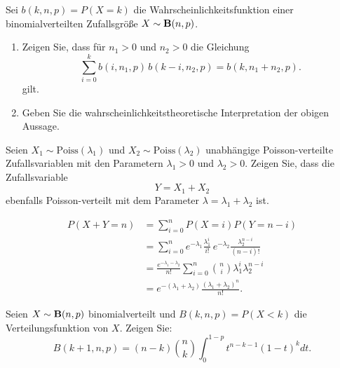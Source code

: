 \solution


Sei $b(k, n, p)=P(X=k)$ die Wahrscheinlichkeitsfunktion einer binomialverteilten
Zufallsgröße $X\sim\mathbf B(n,p)$.
\begin{enumerate}
    \item Zeigen Sie, dass für $n_1>0$ und $n_2>0$ die Gleichung
        \begin{equation*}
            \sum_{i=0}^{k} b(i, n_1, p)\, b( k-i, n_2, p) = b( k, n_1+n_2, p ).
        \end{equation*}
        gilt. 

    \item Geben Sie die wahrscheinlichkeitstheoretische Interpretation der
        obigen Aussage.
\end{enumerate}


 Seien $X_1\sim
\text{Poiss}(\lambda_1)$ und $X_2\sim \text{Poiss}(\lambda_2)$ unabhängige
Poisson-verteilte Zufallsvariablen mit den Parametern $\lambda_1>0$ und
$\lambda_2>0$. Zeigen Sie, dass die Zufallsvariable
\begin{equation*}
    Y = X_1 + X_2
\end{equation*}
ebenfalls Poisson-verteilt mit dem Parameter $\lambda=\lambda_1 + \lambda_2$ ist. 

\solution 
\begin{align*}
    P\left( X+Y=n \right) &= \sum_{i=0}^{n} P(X=i) P(Y=n-i) \\
    &= \sum_{i=0}^{n} e^{-\lambda_1} \frac{\lambda_{1}^{i}}{i!}\, e^{-\lambda_2} \frac{ \lambda_2^{n-i}}{(n-i)!} \\
    &= \frac{e^{-\lambda_1 -\lambda_2}}{n!} \sum_{i=0}^{n} \binom{n}{i} \lambda_1^{i} \lambda_2^{n-i} \\
    &= e^{- (\lambda_1 + \lambda_2)} \frac{ (\lambda_1 + \lambda_2)^{n}}{n!}.
\end{align*}


 Seien $X\sim\mathbf B(n,p)$ binomialverteilt
und $B(k, n, p) = P( X <k)$ die Verteilungsfunktion von $X$. Zeigen Sie:
\begin{equation*}
    B(k+1, n, p) = (n-k) \binom{n}{k} \int_{0}^{1-p} t^{n-k-1} (1-t)^k dt.
\end{equation*}

